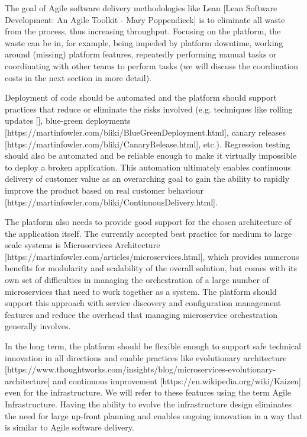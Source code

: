 \documentclass[reprint,amsmath,amssymb,aps]{revtex4-1}
\begin{document}
The goal of Agile software delivery methodologies like Lean [Lean Software Development: An Agile Toolkit - Mary Poppendieck] is to eliminate all waste from the process, thus increasing throughput. Focusing on the platform, the waste can be in, for example, being impeded by platform downtime, working around (missing) platform features, repeatedly performing manual tasks or coordinating with other teams to perform tasks (we will discuss the coordination costs in the next section in more detail).

Deployment of code should be automated and the platform should support practices that reduce or eliminate the risks involved (e.g. techniques like rolling updates [], blue-green deployments [https://martinfowler.com/bliki/BlueGreenDeployment.html], canary releases [https://martinfowler.com/bliki/CanaryRelease.html], etc.). Regression testing should also be automated and be reliable enough to make it virtually impossible to deploy a broken application. This automation ultimately enables continuous delivery of customer value as an overarching goal to gain the ability to rapidly improve the product based on real customer behaviour [https://martinfowler.com/bliki/ContinuousDelivery.html].

The platform also needs to provide good support for the chosen architecture of the application itself. The currently accepted best practice for medium to large scale systems is Microservices Architecture [https://martinfowler.com/articles/microservices.html], which provides numerous benefits for modularity and scalability of the overall solution, but comes with its own set of difficulties in managing the orchestration of a large number of microservices that need to work together as a system. The platform should support this approach with service discovery and configuration management features and reduce the overhead that managing microservice orchestration generally involves.

In the long term, the platform should be flexible enough to support safe technical innovation in all directions and enable practices like evolutionary architecture [https://www.thoughtworks.com/insights/blog/microservices-evolutionary-architecture] and continuous improvement [https://en.wikipedia.org/wiki/Kaizen] even for the infrastructure. We will refer to these features using the term Agile Infrastructure. Having the ability to evolve the infrastructure design eliminates the need for large up-front planning and enables ongoing innovation in a way that is similar to Agile software delivery.
\end{document}
